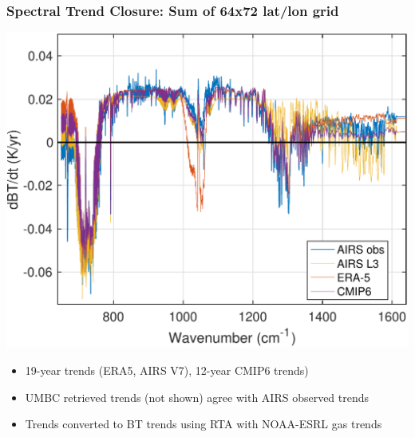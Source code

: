 \documentclass[10pt,t]{beamer}
\begin{document}
\begin{frame}
\frametitle{Spectral Trend Closure: Sum of 64x72 lat/lon grid}  
\vspace{-0.1in}
\begin{center}
\includegraphics[width=0.75\linewidth]{Figslls/model_vs_obs_BTtrends_lls.pdf}
\end{center}
\vspace{-0.1in}
\begin{small}
\begin{itemize}
\item 19-year trends (ERA5, AIRS V7), 12-year CMIP6 trends)
\item UMBC retrieved trends (not shown) agree with AIRS observed trends
\item Trends converted to BT trends using RTA with NOAA-ESRL gas trends  
\end{itemize}
\end{small}
\end{frame}
\end{document}
